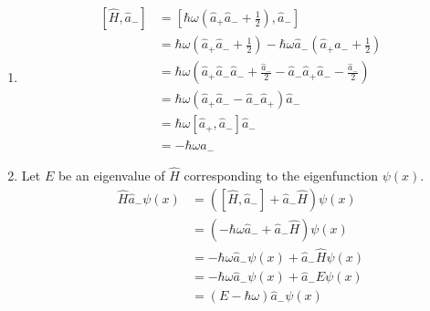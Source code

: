 \documentclass[fleqn, a4paper, 11pt, oneside]{amsart}
\theoremstyle{definition}
\theoremstyle{theorem}
\begin{document}
\begin{solution}
	\begin{enumerate}[leftmargin=*]
		\item
			\begin{align*}
				\left[ \hat{H},\hat{a}_- \right] & = \left[ \hbar \omega \left( \hat{a}_+ \hat{a}_- + \frac{1}{2} \right) , \hat{a}_- \right]                                               \\
                                                                 & = \hbar \omega \left( \hat{a}_+ \hat{a}_- + \frac{1}{2}\right) - \hbar \omega \hat{a}_- \left( \hat{a}_+ \hat{a}_- + \frac{1}{2} \right) \\
                                                                 & = \hbar \omega \left( \hat{a}_+ \hat{a}_- \hat{a}_- + \frac{\hat{a}_-}{2} - \hat{a}_- \hat{a}_+ \hat{a}_- - \frac{\hat{a}_-}{2} \right)  \\
                                                                 & = \hbar \omega \left( \hat{a}_+ \hat{a}_- - \hat{a}_- \hat{a}_+ \right) \hat{a}_-                                                        \\
                                                                 & = \hbar \omega \left[ \hat{a}_+,\hat{a}_- \right] \hat{a}_-                                                                              \\
                                                                 & = -\hbar \omega \hat{a}_-
			\end{align*}
		\item
			Let $E$ be an eigenvalue of $\hat{H}$ corresponding to the eigenfunction $\psi(x)$.
			\begin{align*}
				\hat{H} \hat{a}_- \psi(x) & = \left( \left[ \hat{H},\hat{a}_- \right] + \hat{a}_- \hat{H} \right) \psi(x) \\
                                                          & = \left( -\hbar \omega \hat{a}_- + \hat{a}_- \hat{H} \right) \psi(x)          \\
                                                          & = -\hbar \omega \hat{a}_- \psi(x) + \hat{a}_- \hat{H} \psi(x)                 \\
                                                          & = -\hbar \omega \hat{a}_- \psi(x) + \hat{a}_- E \psi(x)                       \\
                                                          & = (E - \hbar \omega) \hat{a}_- \psi(x)
			\end{align*}

\end{enumerate}
\end{solution}
\end{document}
